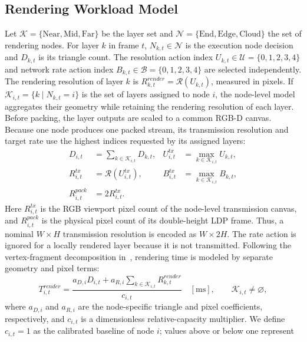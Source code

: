 \documentclass[acmsmall]{acmart}
\begin{document}
	\subsection{Rendering Workload Model}
	\label{sec:workload_model}
	Let $\mathcal{K}=\{\mathrm{Near},\mathrm{Mid},\mathrm{Far}\}$ be the layer set and
	$\mathcal{N}=\{\mathrm{End},\mathrm{Edge},\mathrm{Cloud}\}$ the set of rendering nodes.
	For layer $k$ in frame $t$, $N_{k,t}\in\mathcal{N}$ is the execution node decision and
	$D_{k,t}$ is its triangle count. The resolution action index
	$U_{k,t}\in\mathcal{U}=\{0,1,2,3,4\}$ and network rate action index
	$B_{k,t}\in\mathcal{B}=\{0,1,2,3,4\}$ are selected independently. The rendering resolution of
	layer $k$ is $R^{render}_{k,t}=\mathcal{R}(U_{k,t})$, measured in pixels. If
	$\mathcal{K}_{i,t}=\{k\mid N_{k,t}=i\}$ is the set of layers assigned to node $i$, the
	node-level model aggregates their geometry while retaining the rendering resolution of each layer.
	Before packing, the layer outputs are scaled to a common RGB-D canvas. Because one node produces
	one packed stream, its transmission resolution and target rate use the highest
	indices requested by its assigned layers:
	\begin{align}
		D_{i,t}&=\sum_{k\in\mathcal{K}_{i,t}}D_{k,t}, &
		U^{tx}_{i,t}&=\max_{k\in\mathcal{K}_{i,t}}U_{k,t},\\
		R^{tx}_{i,t}&=\mathcal{R}(U^{tx}_{i,t}), &
		B^{tx}_{i,t}&=\max_{k\in\mathcal{K}_{i,t}}B_{k,t},\\
		R^{pack}_{i,t}&=2R^{tx}_{i,t}.
	\end{align}
	Here $R^{tx}_{i,t}$ is the RGB viewport pixel count of the node-level transmission canvas, and
	$R^{pack}_{i,t}$ is the physical pixel count of its double-height LDP frame. Thus, a nominal
	$W\times H$ transmission resolution is encoded as $W\times2H$. The rate action is
	ignored for a locally rendered layer because it is not transmitted. Following the vertex-fragment decomposition
	in~\cite{xu_wireless_2025}, rendering time is modeled by separate geometry and pixel terms:
	\begin{equation}
		T^{render}_{i,t}=
		\frac{a_{D,i}D_{i,t}+a_{R,i}
		\sum_{k\in\mathcal{K}_{i,t}}R^{render}_{k,t}}{c_{i,t}}
		\quad [\mathrm{ms}], \qquad \mathcal{K}_{i,t}\ne\varnothing ,
		\label{eq:render_time}
	\end{equation}
	where $a_{D,i}$ and $a_{R,i}$ are the node-specific triangle and pixel coefficients,
	respectively, and $c_{i,t}$ is a dimensionless relative-capacity multiplier. We define
	$c_{i,t}=1$ as the calibrated baseline of node $i$; values above or below one represent
\end{document}
